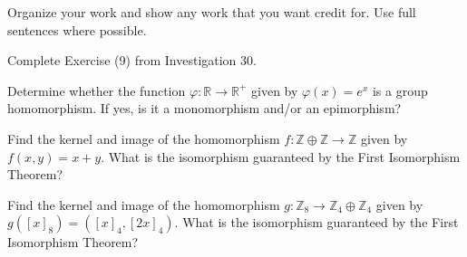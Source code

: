\documentclass[addpoints]{exam}
\begin{document}
Organize your work and show any work that you want credit for. Use full sentences where possible.

\begin{questions}

\question 
Complete Exercise (9) from Investigation 30.

\question Determine whether the function $\varphi\colon \mathbb{R}\to\mathbb{R}^+$ given by $\varphi(x)=e^x$ is a group homomorphism. If yes, is it a monomorphism and/or an epimorphism?

\question 
Find the kernel and image of the homomorphism $f\colon\mathbb{Z}\oplus\mathbb{Z}\to\mathbb{Z}$ given by $f(x,y)=x+y$. What is the isomorphism guaranteed by the First Isomorphism Theorem?

\question 
Find the kernel and image of the homomorphism $g\colon\mathbb{Z}_8\to\mathbb{Z}_4\oplus\mathbb{Z}_4$ given by $g([x]_8)=([x]_4,[2x]_4)$. What is the isomorphism guaranteed by the First Isomorphism Theorem?



\end{questions}
\end{document}
